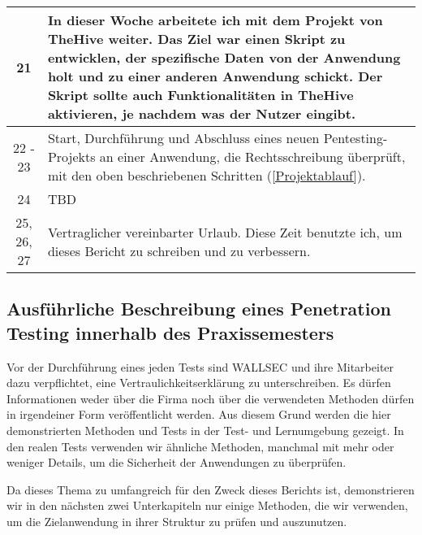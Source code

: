 \begin{table}[H]
\begin{tabularx}{\textwidth}{|c|X|}
    \hline

    21     &  In dieser Woche arbeitete ich mit dem Projekt von \gls{TheHive} weiter. Das Ziel war einen \gls{Skript} zu entwicklen, der spezifische Daten von der Anwendung holt und zu einer anderen Anwendung schickt. Der Skript sollte auch Funktionalitäten in TheHive aktivieren, je nachdem was der Nutzer eingibt. \\

    \hline

    22 - 23  &  Start, Durchführung und Abschluss eines neuen Pentesting-Projekts an einer Anwendung, die Rechtsschreibung überprüft, mit den oben beschriebenen Schritten (\ref{Projektablauf}). \\

    \hline

    24     &  TBD \\

    \hline

    25, 26, 27 &  Vertraglicher vereinbarter Urlaub. Diese Zeit benutzte ich, um dieses Bericht zu schreiben und zu verbessern. \\

    \hline

       \bottomrule
    \end{tabularx}
\end{table}


   



\subsection{Ausführliche Beschreibung eines Penetration Testing innerhalb des Praxissemesters}

Vor der Durchführung eines jeden Tests sind WALLSEC und ihre Mitarbeiter dazu verpflichtet, eine Vertraulichkeitserklärung zu unterschreiben. Es dürfen Informationen weder über die Firma noch über die verwendeten Methoden dürfen in irgendeiner Form veröffentlicht werden. Aus diesem Grund werden die hier demonstrierten Methoden und Tests in der Test- und Lernumgebung  gezeigt. In den realen Tests verwenden wir ähnliche Methoden, manchmal mit mehr oder weniger Details, um die Sicherheit der Anwendungen zu überprüfen. 

Da dieses Thema zu umfangreich für den Zweck dieses Berichts ist, demonstrieren wir in den nächsten zwei Unterkapiteln nur einige Methoden, die wir verwenden, um die Zielanwendung in ihrer Struktur zu prüfen und auszunutzen.


